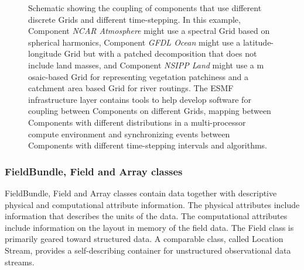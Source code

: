 \begin{figure}
\caption{Schematic showing the coupling of components that use different discrete 
Grids and different time-stepping.  In this example, Component {\it NCAR Atmosphere} 
might use a spectral Grid based on spherical harmonics, Component
{\it GFDL Ocean} might use a latitude-longitude Grid but with a patched decomposition 
that does not include land masses, and Component {\it NSIPP Land} might use a m
osaic-based Grid for representing vegetation patchiness and a catchment area based 
Grid for river routings. The ESMF infrastructure layer contains tools to help develop 
software for coupling between Components on different Grids, mapping between Components 
with different distributions in a multi-processor compute environment and synchronizing 
events between Components with different time-stepping intervals 
and algorithms.  }
\label{fig:threecomponents}
\end{figure}

\subsubsection{FieldBundle, Field and Array classes}
FieldBundle, Field and Array classes contain data together with descriptive
physical and computational attribute information. The physical attributes 
include information that describes the units of the data. The computational 
attributes include information on the layout in memory of the field data. The 
Field class is primarily geared toward structured data. A comparable class, 
called Location Stream, provides a self-describing
container for unstructured observational data streams.


